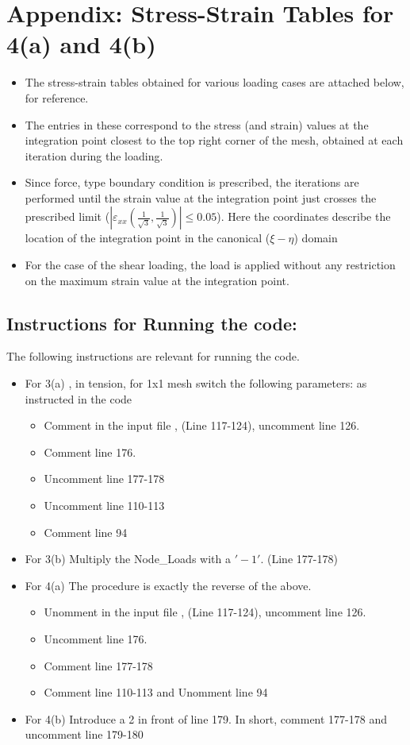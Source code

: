 \section*{Appendix: Stress-Strain Tables for 4(a) and 4(b)}
\begin{itemize}
\item The stress-strain tables obtained for various loading cases are attached below, for reference. 
\item The entries in these correspond to the stress (and strain) values at the integration point closest to the top right corner of the mesh, obtained at each iteration during the loading. 
\item Since force, type boundary condition is prescribed, the iterations are performed until the strain value at the integration point just crosses the prescribed limit ($|\varepsilon_{xx}\left(\frac{1}{\sqrt{3}},\frac{1}{\sqrt{3}}\right)| \leq 0.05$). Here the coordinates describe the location of the integration point in the canonical ($\xi-\eta$) domain
\item For the case of the shear loading, the load is applied without any restriction on the maximum strain value at the integration point. 
\end{itemize}
\newpage \subsection*{Instructions for Running the code:}
The following instructions are relevant for running the code.  
\begin{itemize}
\item For 3(a) , in tension, for 1x1 mesh switch the following parameters: as instructed in the code
\begin{itemize}
\item Comment in the input file , (Line 117-124), uncomment line 126.
\item Comment line 176.
\item Uncomment line 177-178
\item Uncomment line 110-113
\item Comment line 94
\end{itemize}
\item For 3(b) Multiply the Node\_Loads with a $'-1'$. (Line 177-178)
\item For 4(a) The procedure is exactly the reverse of the above. 
\begin{itemize}
\item Unomment in the input file , (Line 117-124), uncomment line 126.
\item Uncomment line 176.
\item Comment line 177-178
\item Comment line 110-113 and Unomment line 94
\end{itemize}
\item For 4(b) Introduce a 2 in front of line 179. In short, comment 177-178 and uncomment line 179-180 
\end{itemize}
